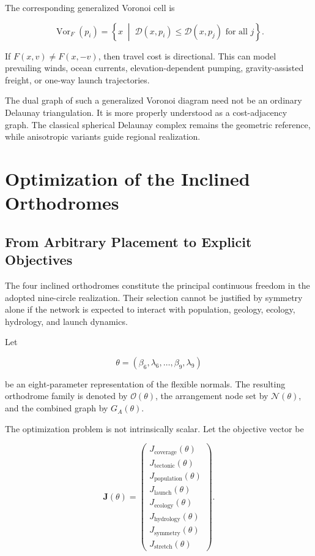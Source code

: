\documentclass[11pt,fleqn]{book}
\numberwithin{equation}{chapter}
\theoremstyle{plain}
\theoremstyle{definition}
\theoremstyle{remark}
\newcommand{\Oset}{\mathcal{O}}
\newcommand{\Nset}{\mathcal{N}}
\newcommand{\Vor}{\operatorname{Vor}}
\newcommand{\suchthat}{\;\middle|\;}
\begin{document}
The corresponding generalized Voronoi cell is

\begin{equation}
    \Vor_F(p_i)
    =
    \left\{
    x
    \suchthat
    \mathcal{D}(x,p_i)
    \leq
    \mathcal{D}(x,p_j)
    \text{ for all }j
    \right\}.
\end{equation}

If \(F(x,v)\neq F(x,-v)\), then travel cost is directional. This can model prevailing winds, ocean currents, elevation-dependent pumping, gravity-assisted freight, or one-way launch trajectories.

The dual graph of such a generalized Voronoi diagram need not be an ordinary Delaunay triangulation. It is more properly understood as a cost-adjacency graph. The classical spherical Delaunay complex remains the geometric reference, while anisotropic variants guide regional realization.

\chapter{Optimization of the Inclined Orthodromes}

\section{From Arbitrary Placement to Explicit Objectives}

The four inclined orthodromes constitute the principal continuous freedom in the adopted nine-circle realization. Their selection cannot be justified by symmetry alone if the network is expected to interact with population, geology, ecology, hydrology, and launch dynamics.

Let

\begin{equation}
    \theta
    =
    (\beta_6,\lambda_6,\dots,\beta_9,\lambda_9)
\end{equation}

be an eight-parameter representation of the flexible normals. The resulting orthodrome family is denoted by \(\Oset(\theta)\), the arrangement node set by \(\Nset(\theta)\), and the combined graph by \(G_A(\theta)\).

The optimization problem is not intrinsically scalar. Let the objective vector be

\begin{equation}
    \mathbf{J}(\theta)
    =
    \begin{pmatrix}
      J_{\mathrm{coverage}}(\theta)\\
      J_{\mathrm{tectonic}}(\theta)\\
      J_{\mathrm{population}}(\theta)\\
      J_{\mathrm{launch}}(\theta)\\
      J_{\mathrm{ecology}}(\theta)\\
      J_{\mathrm{hydrology}}(\theta)\\
      J_{\mathrm{symmetry}}(\theta)\\
      J_{\mathrm{stretch}}(\theta)
    \end{pmatrix}.
\end{equation}
\end{document}
